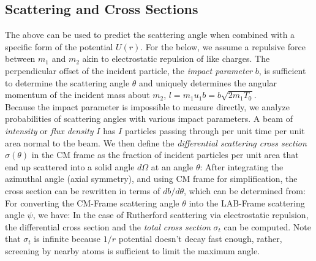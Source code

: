 \subsection{Scattering and Cross Sections}
%
The above can be used to predict the scattering angle when combined with a specific form of the potential $U(r)$. For the below, we assume a repulsive force between $m_1$ and $m_2$ akin to electrostatic repulsion of like charges. The perpendicular offset of the incident particle, the \textit{impact parameter} $b$, is sufficient to determine the scattering angle $\theta$ and uniquely determines the angular momentum of the incident mass about $m_2$, $l=m_1 u_1 b = b\sqrt{2m_1 T_0}$.
\\
Because the impact parameter is impossible to measure directly, we analyze probabilities of scattering angles with various impact parameters. A beam of \textit{intensity} or \textit{flux density} $I$ has $I$ particles passing through per unit time per unit area normal to the beam. We then define the \textit{differential scattering cross section} $\sigma(\theta)$ in the CM frame as the fraction of incident particles per unit area that end up scattered into a solid angle $d\Omega$ at an angle $\theta$:
After integrating the azimuthal angle (axial symmetry), and using CM frame for simplification, the cross section can be rewritten in terms of $db/d\theta$, which can be determined from:
For converting the CM-Frame scattering angle $\theta$ into the LAB-Frame scattering angle $\psi$, we have:
In the case of Rutherford scattering via electrostatic repulsion, the differential cross section and the \textit{total cross section} $\sigma_t$ can be computed. Note that $\sigma_t$ is infinite because $1/r$ potential doesn't decay fast enough, rather, screening by nearby atoms is sufficient to limit the maximum angle.

